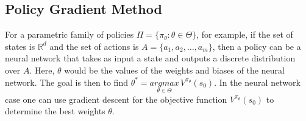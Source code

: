 \subsection{Policy Gradient Method}
For a parametric family of policies $\Pi = \{\pi_\theta:\theta\in\Theta\}$, for example, if the set of states is $\mathbb{R}^d$ and
the set of actions is $A = \{a_1, a_2, \ldots, a_m\}$, then a policy can be a neural network that takes as input a state and outputs a discrete distribution over $A$. Here, $\theta$ would be the values of the weights and biases of the neural network.
\newpar{}
The goal is then to find $\theta^* = \underset{\theta\in\Theta}{argmax}\,V^{\pi_\theta}(s_0)$.
\newpar{}
In the neural network case one can use gradient descent for the objective function $V^{\pi_\theta}(s_0)$ to determine the best weights $\theta$.
